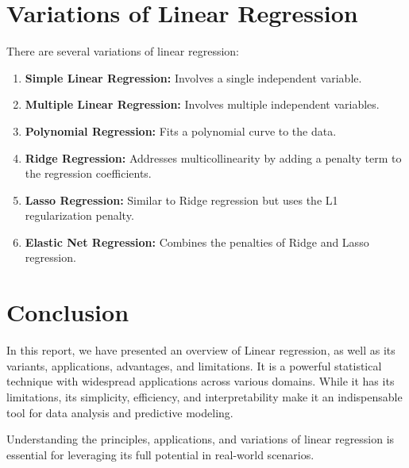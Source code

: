 \documentclass{article}
\begin{document}
\section{Variations of Linear Regression}
There are several variations of linear regression:
\begin{enumerate}
    \item \textbf{Simple Linear Regression:} Involves a single independent variable.
    \item \textbf{Multiple Linear Regression:} Involves multiple independent variables.
    \item \textbf{Polynomial Regression:} Fits a polynomial curve to the data.
    \item \textbf{Ridge Regression:} Addresses multicollinearity by adding a penalty term to the regression coefficients.
    \item \textbf{Lasso Regression:} Similar to Ridge regression but uses the L1 regularization penalty.
    \item \textbf{Elastic Net Regression:} Combines the penalties of Ridge and Lasso regression.
\end{enumerate}

\section{Conclusion}
In this report, we have presented an overview of Linear regression, as well as its variants, applications, advantages, and limitations.
It is a powerful statistical technique with widespread applications across various domains. While it has its limitations, its simplicity, efficiency, and interpretability make it an indispensable tool for data analysis and predictive modeling.

Understanding the principles, applications, and variations of linear regression is essential for leveraging its full potential in real-world scenarios.
\end{document}
